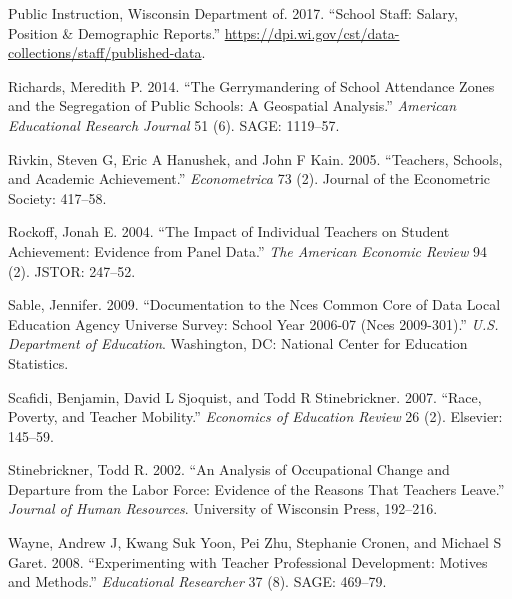\documentclass[12pt,]{article}
\begin{document}
\hypertarget{ref-dpi}{}
Public Instruction, Wisconsin Department of. 2017. ``School Staff:
Salary, Position \& Demographic Reports.''
\url{https://dpi.wi.gov/cst/data-collections/staff/published-data}.

\hypertarget{ref-richards}{}
Richards, Meredith P. 2014. ``The Gerrymandering of School Attendance
Zones and the Segregation of Public Schools: A Geospatial Analysis.''
\emph{American Educational Research Journal} 51 (6). SAGE: 1119--57.

\hypertarget{ref-rivkin}{}
Rivkin, Steven G, Eric A Hanushek, and John F Kain. 2005. ``Teachers,
Schools, and Academic Achievement.'' \emph{Econometrica} 73 (2). Journal
of the Econometric Society: 417--58.

\hypertarget{ref-rockoff}{}
Rockoff, Jonah E. 2004. ``The Impact of Individual Teachers on Student
Achievement: Evidence from Panel Data.'' \emph{The American Economic
Review} 94 (2). JSTOR: 247--52.

\hypertarget{ref-sable}{}
Sable, Jennifer. 2009. ``Documentation to the Nces Common Core of Data
Local Education Agency Universe Survey: School Year 2006-07 (Nces
2009-301).'' \emph{U.S. Department of Education}. Washington, DC:
National Center for Education Statistics.

\hypertarget{ref-scafidi}{}
Scafidi, Benjamin, David L Sjoquist, and Todd R Stinebrickner. 2007.
``Race, Poverty, and Teacher Mobility.'' \emph{Economics of Education
Review} 26 (2). Elsevier: 145--59.

\hypertarget{ref-stinebrickner}{}
Stinebrickner, Todd R. 2002. ``An Analysis of Occupational Change and
Departure from the Labor Force: Evidence of the Reasons That Teachers
Leave.'' \emph{Journal of Human Resources}. University of Wisconsin
Press, 192--216.

\hypertarget{ref-wayne}{}
Wayne, Andrew J, Kwang Suk Yoon, Pei Zhu, Stephanie Cronen, and Michael
S Garet. 2008. ``Experimenting with Teacher Professional Development:
Motives and Methods.'' \emph{Educational Researcher} 37 (8). SAGE:
469--79.
\end{document}
